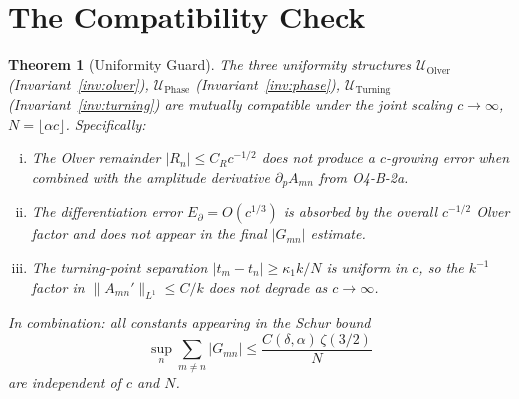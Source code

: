 \documentclass[12pt,a4paper]{amsart}
\newtheorem{theorem}{Theorem}[section]
\theoremstyle{definition}
\newcommand{\Uolv}{\mathcal{U}_{\mathrm{Olver}}}
\newcommand{\Uph}{\mathcal{U}_{\mathrm{Phase}}}
\newcommand{\Utp}{\mathcal{U}_{\mathrm{Turning}}}
\begin{document}
\section{The Compatibility Check}
\label{sec:compatibility}

\begin{theorem}[Uniformity Guard]\label{thm:guard}
The three uniformity structures
$\Uolv$ (Invariant~\ref{inv:olver}),
$\Uph$ (Invariant~\ref{inv:phase}),
$\Utp$ (Invariant~\ref{inv:turning})
are mutually compatible under the joint scaling
$c \to \infty$, $N = \lfloor \alpha c \rfloor$.
Specifically:
\begin{enumerate}[(i)]
  \item\label{it:no-leak-olver}
        The Olver remainder $|R_n| \leq C_R c^{-1/2}$ does not
        produce a $c$-growing error when combined with the
        amplitude derivative $\partial_p A_{mn}$ from O4-B-2a.
  \item\label{it:no-leak-phase}
        The differentiation error $E_\partial = O(c^{1/3})$
        is absorbed by the overall $c^{-1/2}$ Olver factor
        and does not appear in the final $|G_{mn}|$ estimate.
  \item\label{it:no-leak-turning}
        The turning-point separation $|t_m - t_n| \geq \kappa_1 k/N$
        is uniform in $c$, so the $k^{-1}$ factor in
        $\|A_{mn}'\|_{L^1} \leq C/k$ does not degrade as $c \to \infty$.
\end{enumerate}
In combination: all constants appearing in the Schur bound
\[
  \sup_n \sum_{m \neq n} |G_{mn}| \leq \frac{C(\delta,\alpha)\,\zeta(3/2)}{N}
\]
are independent of $c$ and $N$.
\end{theorem}
\end{document}
